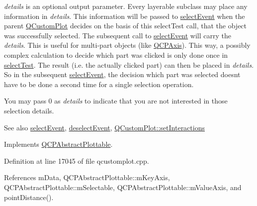 {\itshape details} is an optional output parameter. Every layerable subclass may place any information in {\itshape details}. This information will be passed to \hyperlink{class_q_c_p_abstract_plottable_a16aaad02456aa23a759efd1ac90c79bf}{select\+Event} when the parent \hyperlink{class_q_custom_plot}{Q\+Custom\+Plot} decides on the basis of this select\+Test call, that the object was successfully selected. The subsequent call to \hyperlink{class_q_c_p_abstract_plottable_a16aaad02456aa23a759efd1ac90c79bf}{select\+Event} will carry the {\itshape details}. This is useful for multi-\/part objects (like \hyperlink{class_q_c_p_axis}{Q\+C\+P\+Axis}). This way, a possibly complex calculation to decide which part was clicked is only done once in \hyperlink{class_q_c_p_curve_a5af9949e725704811bbc81ecd5970b8e}{select\+Test}. The result (i.\+e. the actually clicked part) can then be placed in {\itshape details}. So in the subsequent \hyperlink{class_q_c_p_abstract_plottable_a16aaad02456aa23a759efd1ac90c79bf}{select\+Event}, the decision which part was selected doesn\textquotesingle{}t have to be done a second time for a single selection operation.

You may pass 0 as {\itshape details} to indicate that you are not interested in those selection details.

\begin{DoxySeeAlso}{See also}
\hyperlink{class_q_c_p_abstract_plottable_a16aaad02456aa23a759efd1ac90c79bf}{select\+Event}, \hyperlink{class_q_c_p_abstract_plottable_a6fa0d0f95560ea8b01ee13f296dab2b1}{deselect\+Event}, \hyperlink{class_q_custom_plot_a5ee1e2f6ae27419deca53e75907c27e5}{Q\+Custom\+Plot\+::set\+Interactions} 
\end{DoxySeeAlso}


Implements \hyperlink{class_q_c_p_abstract_plottable_a38efe9641d972992a3d44204bc80ec1d}{Q\+C\+P\+Abstract\+Plottable}.



Definition at line 17045 of file qcustomplot.\+cpp.



References m\+Data, Q\+C\+P\+Abstract\+Plottable\+::m\+Key\+Axis, Q\+C\+P\+Abstract\+Plottable\+::m\+Selectable, Q\+C\+P\+Abstract\+Plottable\+::m\+Value\+Axis, and point\+Distance().



